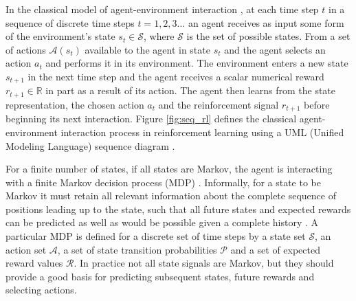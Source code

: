 In the classical model of agent-environment interaction \cite{suttonbarto:1998},
at each time step $t$ in a sequence of discrete time steps $t = 1,2,3\dotsc$ an
agent receives as input some form of the environment's state $s_t \in
\mathscr{S}$, where $\mathscr{S}$ is the set of possible states.  From a set of
actions $\mathscr{A}(s_t)$ available to the agent in state $s_t$ and the agent
selects an action $a_t$ and performs it in its environment.  The environment
enters a new state $s_{t+1}$ in the next time step and the agent receives a
scalar numerical reward $r_{t+1} \in \mathbb{R}$ in part as a result of its
action. The agent then learns from the state representation, the chosen action
$a_t$ and the reinforcement signal $r_{t+1}$ before beginning its next
interaction.  Figure \ref{fig:seq_rl} defines the classical agent-environment
interaction process in reinforcement learning using a UML (Unified Modeling
Language) sequence diagram \cite{alhir:1998}.


For a finite number of states, if all states are Markov, the agent is
interacting with a finite Markov decision process (MDP)
\cite{howard:1964,aima:2003}. Informally, for a state to be Markov it must
retain all relevant information about the complete sequence of positions leading
up to the state, such that all future states and expected rewards can be
predicted as well as would be possible given a complete history
\cite{suttonbarto:1998}.  A particular MDP is defined for a discrete set of time
steps by a state set $\mathscr{S}$, an action set $\mathscr{A}$, a set of state
transition probabilities $\mathscr{P}$ and a set of expected reward values
$\mathscr{R}$.
In practice not all state signals are Markov, but they should provide a good
basis for predicting subsequent states, future rewards and selecting actions.

